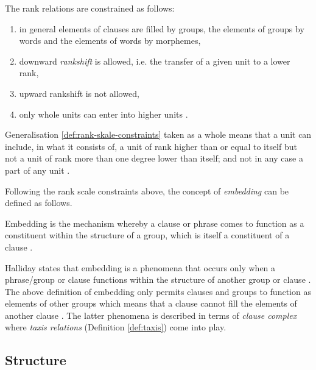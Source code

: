 \begin{generalization}\label{def:rank-skale-constraints}
	The rank relations are constrained as follows:
	\begin{enumerate}
        \item in general elements of clauses are filled by groups, the elements of groups by words and the elements of words by morphemes,
		\item downward \textit{rankshift} is allowed, i.e. the transfer of a given unit to a lower rank,
		\item upward rankshift is not allowed,
		\item only whole units can enter into higher units \citep[44]{Halliday2002}.
	\end{enumerate}
\end{generalization}

Generalisation \ref{def:rank-skale-constraints} taken as a whole means that a unit can include, in what it consists of, a unit of rank higher than or equal to itself but not a unit of rank more than one degree lower than itself; and not in any case a part of any unit \citep[42]{Halliday2002}. 

Following the rank scale constraints above, the concept of \textit{embedding} can be defined as follows. 

\begin{definition}[Embedding]\label{def:embedding0}
    Embedding is the mechanism whereby a clause or phrase comes to function as a constituent within the structure of a group, which is itself a constituent of a clause \citep[242]{Halliday2013}.
\end{definition}

Halliday states that embedding is a phenomena that occurs only when a \mbox{phrase/group} or clause functions within the structure of another group or clause \citep[242]{ifg2}. The above definition of embedding only permits clauses and groups to function as elements of other groups which means that a clause cannot fill the elements of another clause \citep[237]{Fawcett2000}. The latter phenomena is described in terms of \textit{clause complex} where \textit{taxis relations} (Definition \ref{def:taxis}) come into play.

\subsection{Structure}
\label{sec:structure-sydney}

